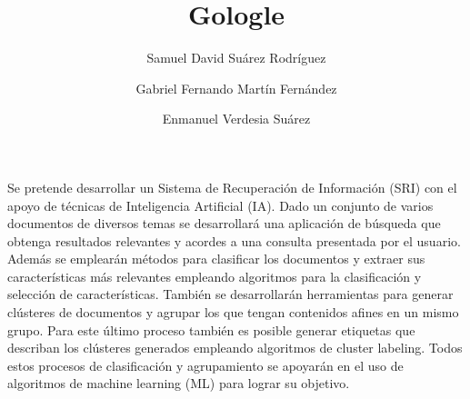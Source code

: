 \documentclass[12pt]{llncs}
\title{Gologle}
\author{
    Samuel David Suárez Rodríguez \and
    Gabriel Fernando Martín Fernández \and
    Enmanuel Verdesia Suárez
}
\date{}
\institute{Universidad de La Habana}
\begin{document}
\maketitle

Se pretende desarrollar un Sistema de Recuperación de Información (SRI) con el apoyo de técnicas de Inteligencia Artificial (IA). Dado un conjunto de varios documentos de diversos temas se desarrollará una aplicación de búsqueda que obtenga resultados relevantes y acordes a una consulta presentada por el usuario. Además se emplearán métodos para clasificar los documentos y extraer sus características más relevantes empleando algoritmos para la clasificación y selección de características. También se desarrollarán herramientas para generar clústeres de documentos y agrupar los que tengan contenidos afines en un mismo grupo. Para este último proceso también es posible generar etiquetas que describan los clústeres generados empleando algoritmos de cluster labeling. Todos estos procesos de clasificación y agrupamiento se apoyarán en el uso de algoritmos de machine learning (ML) para lograr su objetivo.

%  
% 
\end{document}
